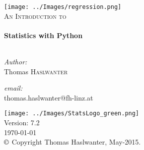 \begin{titlepage}

\begin{center}


\texttt{[image: ../Images/regression.png]}\\[2cm]


\textsc{\Large An Introduction to}\\[0.5cm]


\HRule \\[0.4cm]
{ \huge \bfseries Statistics with Python}\\[0.4cm]

\HRule \\[1.5cm]

\begin{minipage}{0.4\textwidth}
\begin{flushleft} \large
\emph{Author:}\\
Thomas \textsc{Haslwanter}
\end{flushleft}
\end{minipage}
\begin{minipage}{0.4\textwidth}
\begin{flushright} \large
\emph{email:} \\
{\small thomas.haslwanter@fh-linz.at}
\end{flushright}
\end{minipage}

\vfill

\texttt{[image: ../Images/StatsLogo\_green.png]}\\
Version: 7.2 \\
{\large \today} \\[1cm]
\footnotesize{$\copyright$ Copyright Thomas Haslwanter, May-2015.}


\end{center}

\end{titlepage}
